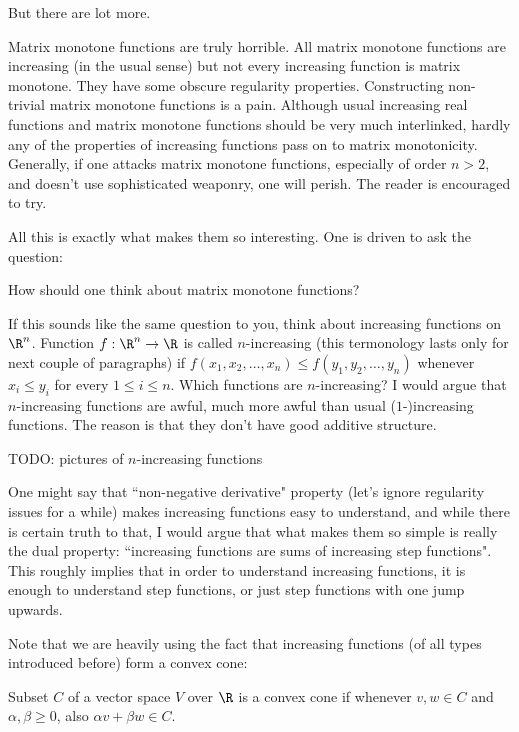 But there are lot more.

Matrix monotone functions are truly horrible. All matrix monotone functions are increasing (in the usual sense) but not every increasing function is matrix monotone. They have some obscure regularity properties. Constructing non-trivial matrix monotone functions is a pain. Although usual increasing real functions and matrix monotone functions should be very much interlinked, hardly any of the properties of increasing functions pass on to matrix monotonicity. Generally, if one attacks matrix monotone functions, especially of order $n > 2$, and doesn't use sophisticated weaponry, one will perish. The reader is encouraged to try.

All this is exactly what makes them so interesting. One is driven to ask the question:

\begin{quest}
	How should one think about matrix monotone functions?
\end{quest}

If this sounds like the same question to you, think about increasing functions on $\R^n$. Function $f : \R^n \to \R$ is called $n$-increasing (this termonology lasts only for next couple of paragraphs) if $f(x_{1}, x_{2}, \ldots, x_{n}) \leq f(y_{1}, y_{2}, \ldots, y_{n})$ whenever $x_{i} \leq y_{i}$ for every $1 \leq i \leq n$. Which functions are $n$-increasing? I would argue that $n$-increasing functions are awful, much more awful than usual ($1$-)increasing functions. The reason is that they don't have good additive structure.

TODO: pictures of $n$-increasing functions

One might say that ``non-negative derivative" property (let's ignore regularity issues for a while) makes increasing functions easy to understand, and while there is certain truth to that, I would argue that what makes them so simple is really the dual property: ``increasing functions are sums of increasing step functions". This roughly implies that in order to understand increasing functions, it is enough to understand step functions, or just step functions with one jump upwards.

Note that we are heavily using the fact that increasing functions (of all types introduced before) form a convex cone:

\begin{maar}
	Subset $C$ of a vector space $V$ over $\R$ is a convex cone if whenever $v, w \in C$ and $\alpha, \beta \geq 0$, also $\alpha v + \beta w \in C$.
\end{maar}

